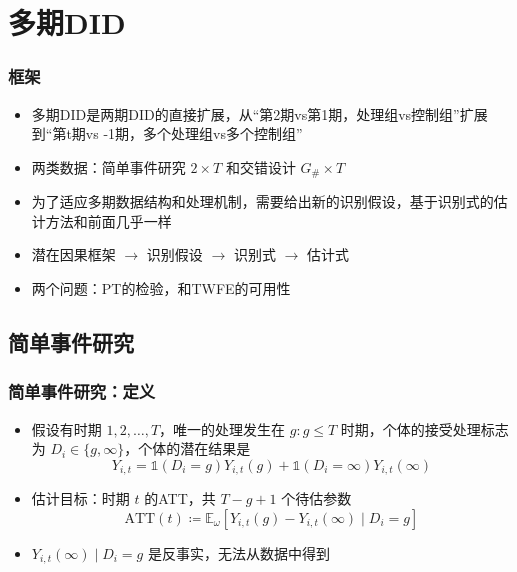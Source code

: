 \documentclass[../didNotes.tex]{subfiles}
\begin{document}
\section{多期DID}

\begin{frame}
  \frametitle{框架}

  \begin{itemize}
    \item 多期DID是两期DID的直接扩展，从``第2期vs第1期，处理组vs控制组''扩展到``第t期vs -1期，多个处理组vs多个控制组''
    \item 两类数据：简单事件研究 $2 \times T$ 和交错设计 $G_{\#} \times T$
    \item 为了适应多期数据结构和处理机制，需要给出新的识别假设，基于识别式的估计方法和前面几乎一样
    \item 潜在因果框架 $\to$ 识别假设 $\to$ 识别式 $\to$ 估计式
    \item 两个问题：PT的检验，和TWFE的可用性
  \end{itemize}

\end{frame}

\subsection{简单事件研究}

\begin{frame}
  \frametitle{简单事件研究：定义}

  \begin{itemize}
    \item 假设有时期 $1,2, \ldots ,T$，唯一的处理发生在 $g: g\le T$ 时期，个体的接受处理标志为 $D_{i} \in \{ g,\infty \}$，个体的潜在结果是
      $$
      Y_{i,t} = \mathbb{1} (D_{i}=g) Y_{i,t}(g) + \mathbb{1} (D_{i}=\infty)Y_{i,t}(\infty)
      $$
    \item 估计目标：时期 $t$ 的ATT，共 $T-g+1$ 个待估参数
      $$
      \text{ATT}(t) \coloneqq \mathbb{E}_{\omega}[Y_{i,t}(g) - Y_{i,t}(\infty) \mid D_{i}=g]
      $$
    \item $Y_{i,t}(\infty) \mid D_{i}=g$ 是反事实，无法从数据中得到
  \end{itemize}

\end{frame}
\end{document}
